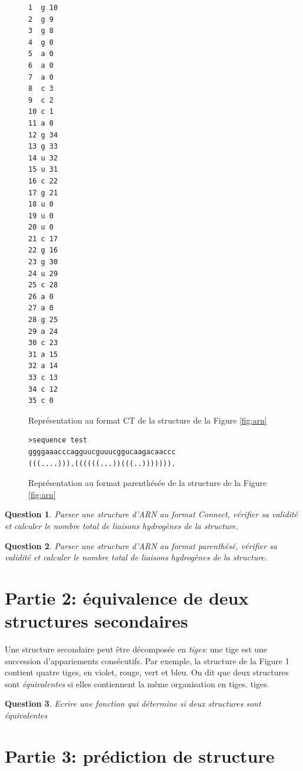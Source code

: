 \documentclass[10pt]{article}
\newtheorem{question}{Question}
\begin{document}
\begin{figure}
\begin{verbatim}
1  g 10
2  g 9
3  g 8
4  g 0
5  a 0
6  a 0
7  a 0
8  c 3
9  c 2
10 c 1
11 a 0
12 g 34
13 g 33
14 u 32
15 u 31
16 c 22
17 g 21
18 u 0
19 u 0
20 u 0
21 c 17
22 g 16
23 g 30
24 u 29
25 c 28
26 a 0
27 a 0
28 g 25
29 a 24
30 c 23
31 a 15
32 a 14
33 c 13
34 c 12
35 c 0
\end{verbatim}
\caption{Représentation au format CT de la structure de la Figure \ref{fig:arn}}
\label{fig:CT}
\end{figure}

\begin{figure}
\large
\begin{verbatim}
>sequence test
ggggaaacccagguucguuucggucaagacaaccc
(((....))).((((((...))(((..))))))).
\end{verbatim}
\caption{Représentation au format parenthésée de la structure de la Figure \ref{fig:arn}}
\label{fig:parenthese}
\end{figure}


\begin{question}
  Parser une structure d'ARN au format Connect, vérifier sa validité et calculer le nombre total de liaisons hydrogènes de la structure. 
\end{question}

\begin{question}
  Parser une structure d'ARN au format parenthésé, vérifier sa validité et calculer le nombre total de liaisons hydrogènes de la structure.
  \end{question}

  \section*{Partie 2: équivalence de deux structures secondaires}

  Une structure secondaire peut être décomposée en {\em tiges}: une tige est une succession d'appariements consécutifs. Par exemple, la structure de la Figure 1 contient quatre tiges, en violet, rouge, vert et bleu. On dit que deux structures sont {\em équivalentes} si elles contiennent la même organisation en tiges. tiges.

  \begin{question}
Ecrire une fonction qui détermine si deux structures sont équivalentes
    \end{question}


 \section*{Partie 3: prédiction de structure}
\end{document}
